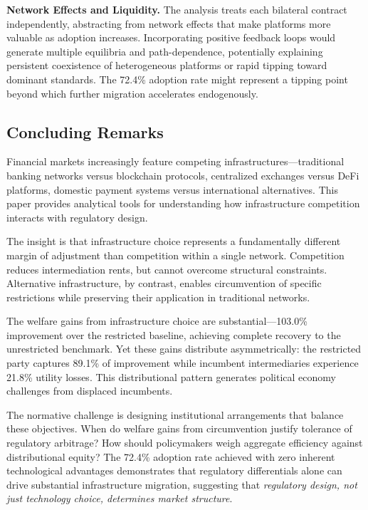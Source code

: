 \documentclass[12pt]{article}
\begin{document}
\textbf{Network Effects and Liquidity.} The analysis treats each bilateral contract independently, abstracting from network effects that make platforms more valuable as adoption increases. Incorporating positive feedback loops would generate multiple equilibria and path-dependence, potentially explaining persistent coexistence of heterogeneous platforms or rapid tipping toward dominant standards. The 72.4\% adoption rate might represent a tipping point beyond which further migration accelerates endogenously.

\subsection{Concluding Remarks}

Financial markets increasingly feature competing infrastructures---traditional banking networks versus blockchain protocols, centralized exchanges versus DeFi platforms, domestic payment systems versus international alternatives. This paper provides analytical tools for understanding how infrastructure competition interacts with regulatory design.

The insight is that infrastructure choice represents a fundamentally different margin of adjustment than competition within a single network. Competition reduces intermediation rents, but cannot overcome structural constraints. Alternative infrastructure, by contrast, enables circumvention of specific restrictions while preserving their application in traditional networks.

The welfare gains from infrastructure choice are substantial---103.0\% improvement over the restricted baseline, achieving complete recovery to the unrestricted benchmark. Yet these gains distribute asymmetrically: the restricted party captures 89.1\% of improvement while incumbent intermediaries experience 21.8\% utility losses. This distributional pattern generates political economy challenges from displaced incumbents.

The normative challenge is designing institutional arrangements that balance these objectives. When do welfare gains from circumvention justify tolerance of regulatory arbitrage? How should policymakers weigh aggregate efficiency against distributional equity? The 72.4\% adoption rate achieved with zero inherent technological advantages demonstrates that regulatory differentials alone can drive substantial infrastructure migration, suggesting that \textit{regulatory design, not just technology choice, determines market structure}.
\end{document}
